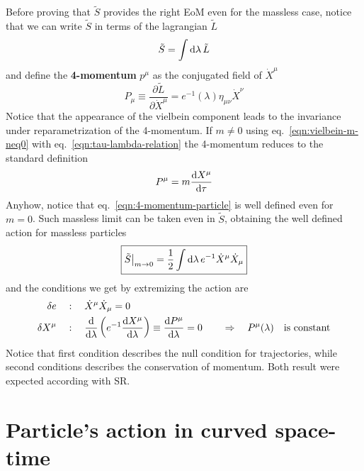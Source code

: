 \documentclass[../main/main.tex]{subfiles}
\begin{document}
Before proving that $\tilde S$ provides the right EoM even for the massless case, notice that we can write $\tilde S$ in terms of the lagrangian $\tilde L$
\[\tilde S=\int\textup{d}\lambda\,\tilde L\]
and define the \textbf{4-momentum} $p^\mu$ as the conjugated field of $\dot X^\mu$
\begin{equation}\label{eqn:4-momentum-particle}
\boxed{
P_\mu\equiv\frac{\partial\tilde L}{\partial\dot X^\mu}=e^{-1}(\lambda)\eta_{\mu\nu}\dot X^\nu
}
\end{equation}
Notice that the appearance of the vielbein component leads to the invariance under reparametrization of the 4-momentum. If $m\neq0$ using eq.~\eqref{eqn:vielbein-m-neq0} with eq.~\eqref{eqn:tau-lambda-relation} the 4-momentum reduces to the standard definition
\[P^\mu=m{\frac{\textup{d} X^\mu}{\textup{d}\tau}}\]
Anyhow, notice that eq.~\eqref{eqn:4-momentum-particle} is well defined even for $m=0$.
Such massless limit can be taken even in $\tilde S$, obtaining the well defined action for massless particles
\begin{equation}
\boxed{
\tilde S\big\vert_{m\to0}=\frac12\int\textup{d}\lambda\,e^{-1}\dot X^\mu\dot X_\mu
}
\end{equation}
and the conditions we get by extremizing the action are
\begin{subequations}
\begin{align}
\delta e\quad&:\quad\dot X^\mu\dot X_\mu=0\\
\delta X^\mu\quad&:\quad\frac{\textup{d}}{\textup{d}\lambda}\left(e^{-1}\frac{\textup{d} X^\mu}{\textup{d}\lambda}\right)\equiv\frac{\textup{d} P^\mu}{\textup{d}\lambda}=0\qquad\Rightarrow\quad P^\mu(\lambda)\quad\text{is constant}
\end{align}
\end{subequations}
Notice that first condition describes the null condition for trajectories, while second conditions describes the conservation of momentum. Both result were expected according with SR.


\section{Particle's action in curved space-time}
\end{document}
